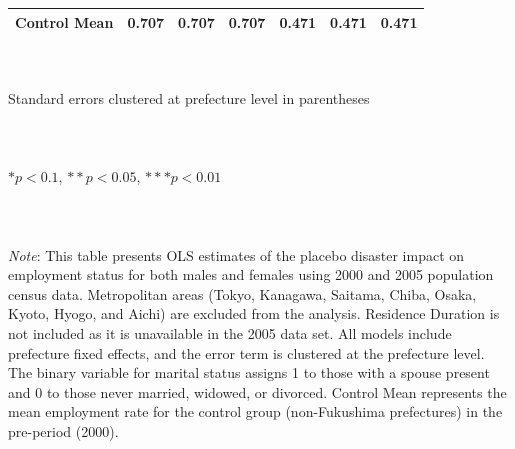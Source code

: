 \documentclass[serif, aspectratio=169]{beamer}
\begin{document}
\begin{frame}[label=employed_placebo]
\begin{table}[htbp]
\begin{tabular}{@{}l*{6}{c}@{}}
Control Mean&    0.707         &    0.707         &    0.707         &    0.471         &    0.471         &    0.471         \\
\bottomrule
\end{tabular}
\\\\{\linewidth}{\tiny Standard errors clustered at prefecture level in parentheses}\\\\
\\\\{\linewidth}{\tiny $*p<0.1$, $**p<0.05$, $***p<0.01$}\\\\
\\\\{\linewidth}{\tiny \textit{Note}: This table presents OLS estimates of the placebo disaster impact on employment status for both males and females using 2000 and 2005 population census data. Metropolitan areas (Tokyo, Kanagawa, Saitama, Chiba, Osaka, Kyoto, Hyogo, and Aichi) are excluded from the analysis. Residence Duration is not included as it is unavailable in the 2005 data set. All models include prefecture fixed effects, and the error term is clustered at the prefecture level. The binary variable for marital status assigns 1 to those with a spouse present and 0 to those never married, widowed, or divorced. Control Mean represents the mean employment rate for the control group (non-Fukushima prefectures) in the pre-period (2000).}
\end{table}


\end{frame}


\end{document}
